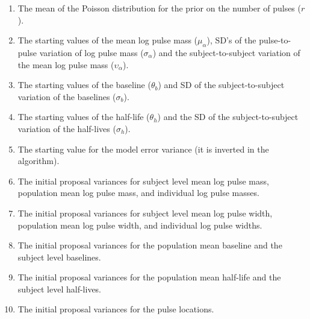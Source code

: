 \documentclass[12pt, oneside]{article}   	%
\begin{document}
\begin{enumerate}
\item The mean of the Poisson distribution for the prior on the number of pulses ($r$).
\item The starting values of the mean log pulse mass ($\mu_\alpha$), SD's of the pulse-to-pulse variation of log pulse mass ($\sigma_\alpha$) and the subject-to-subject variation of the mean log pulse mass ($\upsilon_\alpha$).
\item The starting values of the baseline ($\theta_b$) and SD of the subject-to-subject variation of the baselines ($\sigma_b$).
\item The starting values of the half-life ($\theta_h$) and the SD of the subject-to-subject variation of the half-lives ($\sigma_h$).
\item The starting value for the model error variance (it is inverted in the algorithm).
\item The initial proposal variances for subject level mean log pulse mass, population mean log pulse mass, and individual log pulse masses.
\item The initial proposal variances for subject level mean log pulse width, population mean log pulse width, and individual log pulse widths.
\item The initial proposal variances for the population mean baseline and the subject level baselines.
\item The initial proposal variances for the population mean half-life and the subject level half-lives.
\item The initial proposal variances for the pulse locations.
\end{enumerate}
\end{document}
